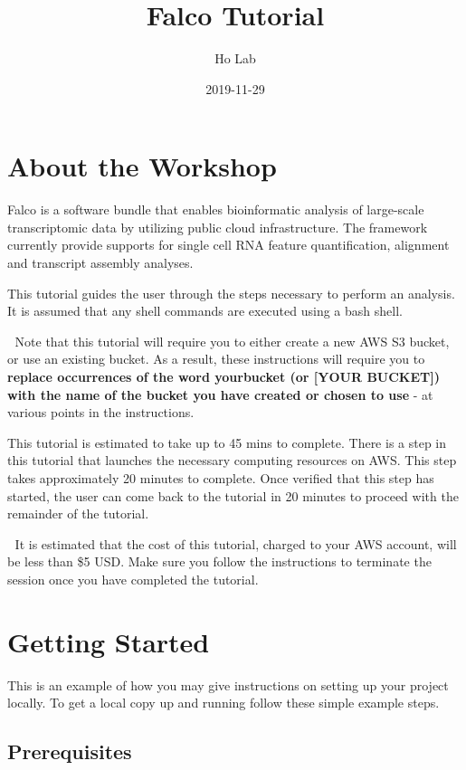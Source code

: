 \documentclass[]{book}
\title{Falco Tutorial}
\author{Ho Lab}
\date{2019-11-29}
\begin{document}
\maketitle

{
\setcounter{tocdepth}{1}
\tableofcontents
}
\hypertarget{about-the-workshop}{%
\chapter{About the Workshop}\label{about-the-workshop}}

Falco is a software bundle that enables bioinformatic analysis of large-scale transcriptomic data by utilizing public cloud infrastructure. The framework currently provide supports for single cell RNA feature quantification, alignment and transcript assembly analyses.

This tutorial guides the user through the steps necessary to perform an analysis. It is assumed that any shell commands are executed using a bash shell.

🔴 Note that this tutorial will require you to either create a new AWS S3 bucket, or use an existing bucket. As a result, these instructions will require you to \textbf{replace occurrences of the word yourbucket (or {[}YOUR BUCKET{]}) with the name of the bucket you have created or chosen to use }- at various points in the instructions.

This tutorial is estimated to take up to 45 mins to complete. There is a step in this tutorial that launches the necessary computing resources on AWS. This step takes approximately 20 minutes to complete. Once verified that this step has started, the user can come back to the tutorial in 20 minutes to proceed with the remainder of the tutorial.

🔴 It is estimated that the cost of this tutorial, charged to your AWS account, will be less than \$5 USD. Make sure you follow the instructions to terminate the session once you have completed the tutorial.

\hypertarget{getting-started}{%
\chapter{Getting Started}\label{getting-started}}

This is an example of how you may give instructions on setting up your project locally. To get a local copy up and running follow these simple example steps.

\hypertarget{prerequisites}{%
\section{Prerequisites}\label{prerequisites}}
\end{document}
